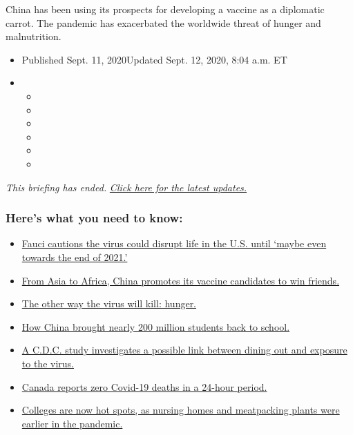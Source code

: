 China has been using its prospects for developing a vaccine as a
diplomatic carrot. The pandemic has exacerbated the worldwide threat of
hunger and malnutrition.

\begin{itemize}
\item
  Published Sept. 11, 2020Updated Sept. 12, 2020, 8:04 a.m. ET
\item
  \begin{itemize}
  \item
  \item
  \item
  \item
  \item
  \item
  \end{itemize}
\end{itemize}

\emph{This briefing has ended.}
\href{https://www.nytimes3xbfgragh.onion/2020/09/12/world/covid-19-coronavirus.html}{\emph{Click
here for the latest updates.}}

\hypertarget{heres-what-you-need-to-know}{%
\subsubsection{Here's what you need to
know:}\label{heres-what-you-need-to-know}}

\begin{itemize}
\tightlist
\item
  \protect\hyperlink{link-dfb8a16}{Fauci cautions the virus could
  disrupt life in the U.S. until `maybe even towards the end of 2021.'}
\item
  \protect\hyperlink{link-7104d154}{From Asia to Africa, China promotes
  its vaccine candidates to win friends.}
\item
  \protect\hyperlink{link-393ad215}{The other way the virus will kill:
  hunger.}
\item
  \protect\hyperlink{link-73bbaf5}{How China brought nearly 200 million
  students back to school.}
\item
  \protect\hyperlink{link-6e19a7f9}{A C.D.C. study investigates a
  possible link between dining out and exposure to the virus.}
\item
  \protect\hyperlink{link-2e6d7d13}{Canada reports zero Covid-19 deaths
  in a 24-hour period.}
\item
  \protect\hyperlink{link-734306aa}{Colleges are now hot spots, as
  nursing homes and meatpacking plants were earlier in the pandemic.}
\end{itemize}

